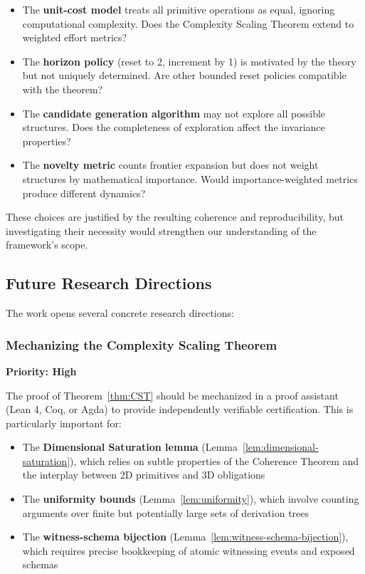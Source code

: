 \documentclass[11pt]{article}
\theoremstyle{definition}
\theoremstyle{remark}
\begin{document}
\begin{itemize}
\item The \textbf{unit-cost model} treats all primitive operations as equal, ignoring computational
complexity. Does the Complexity Scaling Theorem extend to weighted effort metrics?

\item The \textbf{horizon policy} (reset to 2, increment by 1) is motivated by the theory but not
uniquely determined. Are other bounded reset policies compatible with the theorem?

\item The \textbf{candidate generation algorithm} may not explore all possible structures. Does
the completeness of exploration affect the invariance properties?

\item The \textbf{novelty metric} counts frontier expansion but does not weight structures by
mathematical importance. Would importance-weighted metrics produce different dynamics?
\end{itemize}

These choices are justified by the resulting coherence and reproducibility, but investigating their
necessity would strengthen our understanding of the framework's scope.

\subsection{Future Research Directions}

The work opens several concrete research directions:

\subsubsection{Mechanizing the Complexity Scaling Theorem}

\textbf{Priority: High}

The proof of Theorem~\ref{thm:CST} should be mechanized in a proof assistant (Lean 4, Coq, or
Agda) to provide independently verifiable certification. This is particularly important for:

\begin{itemize}
\item The \textbf{Dimensional Saturation lemma} (Lemma~\ref{lem:dimensional-saturation}), which
relies on subtle properties of the Coherence Theorem and the interplay between 2D primitives and
3D obligations

\item The \textbf{uniformity bounds} (Lemma~\ref{lem:uniformity}), which involve counting arguments
over finite but potentially large sets of derivation trees

\item The \textbf{witness-schema bijection} (Lemma~\ref{lem:witness-schema-bijection}), which
requires precise bookkeeping of atomic witnessing events and exposed schemas
\end{itemize}
\end{document}
